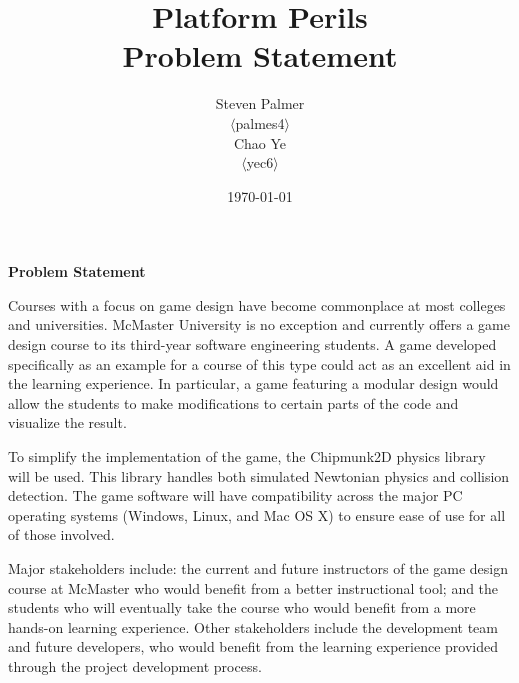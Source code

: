\documentclass[12pt, titlepage]{article}
\begin{document}
\title{\bf Platform Perils\\[\baselineskip]\Large Problem Statement}
\author{Steven Palmer\\$\langle$palmes4$\rangle$\\Chao Ye\\$\langle$yec6$\rangle$}
\date{\today}
	
\maketitle

\begin{center}
\Large \bf Problem Statement
\end{center}

Courses with a focus on game design have become commonplace at most colleges and universities.  McMaster University is no exception and currently offers a game design course to its third-year software engineering students.  A game developed specifically as an example for a course of this type could act as an excellent aid in the learning experience.  In particular, a game featuring a modular design would allow the students to make modifications to certain parts of the code and visualize the result.  

To simplify the implementation of the game, the Chipmunk2D physics library will be used.  This library handles both simulated Newtonian physics and collision detection. The game software will have compatibility across the major PC operating systems (Windows, Linux, and Mac OS X) to ensure ease of use for all of those involved.

Major stakeholders include: the current and future instructors of the game design course at McMaster who would benefit from a better instructional tool; and the students who will eventually take the course who would benefit from a more hands-on learning experience.  Other stakeholders include the development team and future developers, who would benefit from the learning experience provided through the project development process.
\end{document}
